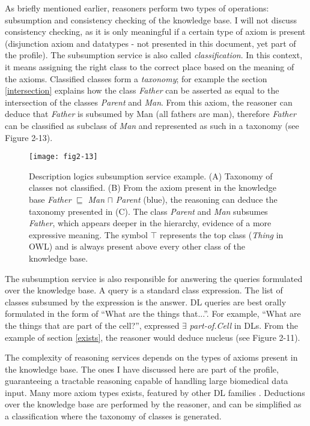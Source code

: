 As briefly mentioned earlier, reasoners perform two types of operations: subsumption and consistency checking of the knowledge base. I will not discuss consistency checking, as it is only meaningful if a certain type of axiom is present (disjunction axiom and datatypes - not presented in this document, yet part of the  profile). The subsumption service is also called \emph{classification}. In this context, it means assigning the right class to the correct place based on the meaning of the axioms. Classified classes form a \emph{taxonomy}; for example the section \ref{intersection} explains how the class \emph{Father} can be asserted as equal to the intersection of the classes \emph{Parent} and \emph{Man}. From this axiom, the reasoner can deduce that \emph{Father} is subsumed by Man (all fathers are man), therefore \emph{Father} can be classified as subclass of \emph{Man} and represented as such in a taxonomy (see Figure 2-13).

\begin{figure}[ht]
    \centering
    \texttt{[image: fig2-13]}
    \caption{Description logics subsumption service example. (A) Taxonomy of classes not classified. (B) From the axiom present in the knowledge base \emph{Father} $ \sqsubseteq $ \emph{Man} $ \sqcap $ \emph{Parent} (blue), the reasoning can deduce the taxonomy presented in (C). The class \emph{Parent} and \emph{Man} subsumes \emph{Father}, which appears deeper in the hierarchy, evidence of a more expressive meaning. The symbol $ \top $ represents the top class (\emph{Thing} in OWL) and is always present above every other class of the knowledge base.}
    \label{fig2-13}
\end{figure}

The subsumption service is also responsible for answering the queries formulated over the knowledge base. A query is a standard class expression. The list of classes subsumed by the expression is the answer. DL queries are best orally formulated in the form of ``What are the things that...''. For example, ``What are the things that are part of the cell?'', expressed $ \exists $ \emph{part-of.Cell} in DLs. From the example of section \ref{exists}, the reasoner would deduce nucleus (see Figure 2-11).

The complexity of reasoning services depends on the types of axioms present in the knowledge base. The ones I have discussed here are part of the  profile, guaranteeing a tractable reasoning capable of handling large biomedical data input. Many more axiom types exists, featured by other DL families \citep{krotzsch2012owl}. Deductions over the knowledge base are performed by the reasoner, and can be simplified as a classification where the taxonomy of classes is generated. 

